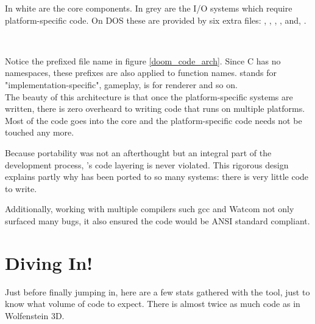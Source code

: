 \pagebreak
{}
\par
In white are the core components. In grey are the I/O systems which require platform-specific code. On DOS these are provided by six extra files: , , , ,  and, .\\









\vspace{-4mm}
\\
\par
Notice the prefixed file name in figure \ref{doom_code_arch}. Since C has no namespaces, these prefixes are also applied to function names.  stands for "implementation-specific",  gameplay,  is for renderer and so on.\\

The beauty of this architecture is that once the platform-specific systems are written, there is zero overheard to writing code that runs on multiple platforms. Most of the code goes into the core and the platform-specific code needs not be touched any more.\\
\par
Because portability was not an afterthought but an integral part of the development process, \doom{}'s code layering is never violated. This rigorous design explains partly why \doom{} has been ported to so many systems: there is very little code to write.\\
\par 
Additionally, working with multiple compilers such gcc and Watcom not only surfaced many bugs, it also ensured the code would be ANSI standard compliant.\\
\vspace{-10pt}
\section{Diving In!}
Just before finally jumping in, here are a few stats gathered with the  tool, just to know what volume of code to expect. There is almost twice as much code as in Wolfenstein 3D.\\
\par
{}
\par

